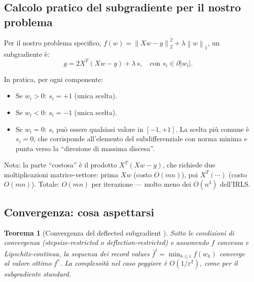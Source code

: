 \documentclass[a4paper,11pt]{article}
\newtheorem{theorem}{Teorema}[section]
\theoremstyle{definition}
\newcommand{\norm}[1]{\left\lVert #1 \right\rVert}
\begin{document}
\subsection{Calcolo pratico del subgradiente per il nostro problema}
\label{subsec:subgrad_computation}

Per il nostro problema specifico, $f(w) = \norm{Xw-y}_2^2 + \lambda\norm{w}_1$, un subgradiente è:
\begin{equation}\label{eq:subgrad_f}
  g = 2X^T(Xw - y) + \lambda\, s, \quad \text{con } s_i \in \partial|w_i|.
\end{equation}

\begin{intuizione}
In pratica, per ogni componente:
\begin{itemize}[nosep]
  \item Se $w_i > 0$: $s_i = +1$ (unica scelta).
  \item Se $w_i < 0$: $s_i = -1$ (unica scelta).
  \item Se $w_i = 0$: $s_i$ può essere qualsiasi valore in $[-1, +1]$. La scelta più comune è $s_i = 0$, che corrisponde all'elemento del subdifferenziale con norma minima e punta verso la ``direzione di massima discesa''.
\end{itemize}
Nota: la parte ``costosa'' è il prodotto $X^T(Xw - y)$, che richiede due moltiplicazioni matrice-vettore: prima $Xw$ (costo $O(mn)$), poi $X^T(\cdots)$ (costo $O(mn)$). Totale: $O(mn)$ per iterazione --- molto meno dei $O(n^3)$ dell'IRLS.
\end{intuizione}

\subsection{Convergenza: cosa aspettarsi}
\label{subsec:defl_convergence_props}

\begin{theorem}[Convergenza del deflected subgradient {\cite{dantonio2009}}]
Sotto le condizioni di convergenza (stepsize-restricted o deflection-restricted) e assumendo $f$ convessa e Lipschitz-continua, la sequenza dei \emph{record values} $\bar{f}^i = \min_{h \leq i} f(w_h)$ converge al valore ottimo $f^*$. La complessità nel caso peggiore è $O(1/\varepsilon^2)$, come per il subgradiente standard.
\end{theorem}
\end{document}
